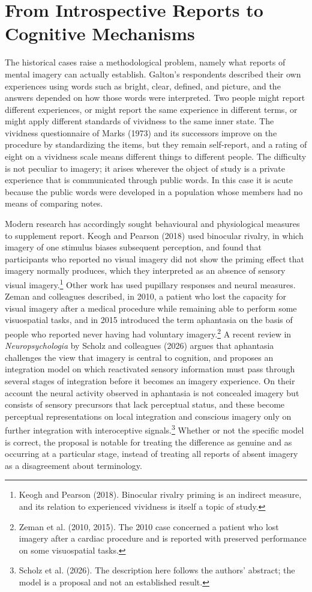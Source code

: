 \documentclass[11pt]{article}
\theoremstyle{remark}
\begin{document}
\section{From Introspective Reports to Cognitive Mechanisms}

The historical cases raise a methodological problem, namely what reports of mental imagery can actually establish. Galton's respondents described their own experiences using words such as bright, clear, defined, and picture, and the answers depended on how those words were interpreted. Two people might report different experiences, or might report the same experience in different terms, or might apply different standards of vividness to the same inner state. The vividness questionnaire of Marks (1973) and its successors improve on the procedure by standardizing the items, but they remain self-report, and a rating of eight on a vividness scale means different things to different people. The difficulty is not peculiar to imagery; it arises wherever the object of study is a private experience that is communicated through public words. In this case it is acute because the public words were developed in a population whose members had no means of comparing notes.

Modern research has accordingly sought behavioural and physiological measures to supplement report. Keogh and Pearson (2018) used binocular rivalry, in which imagery of one stimulus biases subsequent perception, and found that participants who reported no visual imagery did not show the priming effect that imagery normally produces, which they interpreted as an absence of sensory visual imagery.\footnote{Keogh and Pearson (2018). Binocular rivalry priming is an indirect measure, and its relation to experienced vividness is itself a topic of study.} Other work has used pupillary responses and neural measures. Zeman and colleagues described, in 2010, a patient who lost the capacity for visual imagery after a medical procedure while remaining able to perform some visuospatial tasks, and in 2015 introduced the term aphantasia on the basis of people who reported never having had voluntary imagery.\footnote{Zeman et al. (2010, 2015). The 2010 case concerned a patient who lost imagery after a cardiac procedure and is reported with preserved performance on some visuospatial tasks.} A recent review in \emph{Neuropsychologia} by Scholz and colleagues (2026) argues that aphantasia challenges the view that imagery is central to cognition, and proposes an integration model on which reactivated sensory information must pass through several stages of integration before it becomes an imagery experience. On their account the neural activity observed in aphantasia is not concealed imagery but consists of sensory precursors that lack perceptual status, and these become perceptual representations on local integration and conscious imagery only on further integration with interoceptive signals.\footnote{Scholz et al. (2026). The description here follows the authors' abstract; the model is a proposal and not an established result.} Whether or not the specific model is correct, the proposal is notable for treating the difference as genuine and as occurring at a particular stage, instead of treating all reports of absent imagery as a disagreement about terminology.
\end{document}
